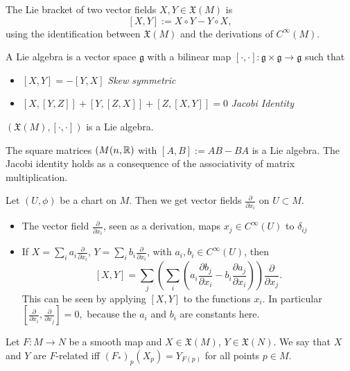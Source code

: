\begin{definition}
    The Lie bracket of two vector fields  $X, Y \in \mathfrak{X}(M)$ is 
    $$[X, Y]:= X\circ Y-Y\circ X,$$
    using the identification between $\mathfrak{X}(M)$ and the derivations of $C^{\infty}(M)$.
\end{definition}
\begin{definition}
    A Lie algebra is a vector space $\mathfrak g$ with a bilinear map $[\cdot , \cdot ]: \mathfrak g \times \mathfrak g \to  \mathfrak g$ such that
    \begin{itemize}
        \item $[X, Y] = -[Y, X]$ \hfill \emph{Skew symmetric}
        \item $[X, [Y, Z]]  + [Y, [Z, X]] + [Z, [X, Y]] = 0$ \hfill \emph{Jacobi Identity}
    \end{itemize}
\end{definition}
\begin{eg}
    $(\mathfrak{X}(M), [\cdot ,\cdot ])$ is a Lie algebra.
\end{eg}
\begin{eg}
  The square matrices  $(M(n, \mathbb{R})$ with $[A,B]:=AB - BA$ is a Lie algebra.
The Jacobi identity holds as a consequence of  the associativity of matrix multiplication.
\end{eg}
\begin{remark}
    Let $(U, \phi)$ be a chart on $M$.
    Then we get vector fields $\frac{\partial }{\partial x_i} $ on $U\subset M$.
    \begin{itemize}
        \item The vector field $\frac{\partial }{\partial x_i}$, seen as a derivation, maps $x_j \in C^{\infty}(U)$ to $\delta_{ij}$ 
        \item If $X = \sum_i a_i \frac{\partial }{\partial x_i} $, $Y = \sum_i b_i \frac{\partial }{\partial x_i}$, with $a_i, b_i \in C^{\infty}(U)$,
 then \[[X, Y] = \sum_j \left(\sum_i \left( a_{i} \frac{\partial b_{j}}{\partial x_i}  - b_{i} \frac{\partial a_{j}}{\partial x_i} \right)\right)  \frac{\partial }{\partial x_j}. \]
This can be seen by applying $[X, Y]$ to the functions $x_{i}$.
            In particular $\left[ \frac{\partial }{\partial x_i} , \frac{\partial }{\partial x_{j}}\right] = 0, $
            because the $a_i$ and $b_i$ are constants here.
    \end{itemize}
\end{remark}
\begin{definition}
    Let $F: M \to  N$ be a smooth map and $X \in \mathfrak{X}(M)$, $Y \in \mathfrak{X}(N)$.
 We say that $X$ and $Y$ are $F$-related iff  $(F_*)_p (X_p) = Y_{F(p)}$ for all points $p\in M$.
\end{definition} 

